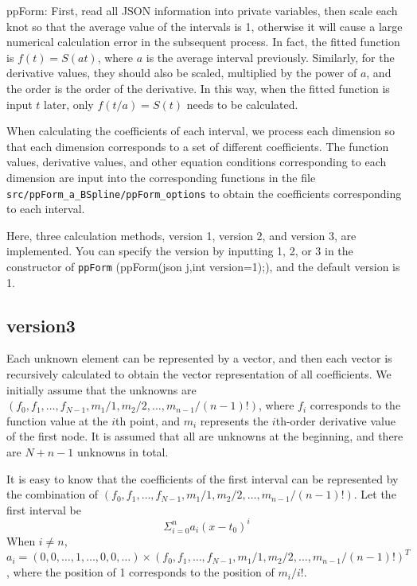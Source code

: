 \documentclass[a4paper]{article}
\begin{document}
ppForm: First, read all JSON information into private variables, then scale each knot so that the average value of the intervals is 1, otherwise it will cause a large numerical calculation error in the subsequent process. In fact, the fitted function is \(f(t) = S(at)\), where \(a\) is the average interval previously. Similarly, for the derivative values, they should also be scaled, multiplied by the power of \(a\), and the order is the order of the derivative. In this way, when the fitted function is input \(t\) later, only \(f(t/a) = S(t)\) needs to be calculated.

When calculating the coefficients of each interval, we process each dimension so that each dimension corresponds to a set of different coefficients. The function values, derivative values, and other equation conditions corresponding to each dimension are input into the corresponding functions in the file \texttt{src/ppForm\_a\_BSpline/ppForm\_options} to obtain the coefficients corresponding to each interval.

Here, three calculation methods, version 1, version 2, and version 3, are implemented. You can specify the version by inputting 1, 2, or 3 in the constructor of \texttt{ppForm} (ppForm(json j,int version=1);), and the default version is 1.

\subsection*{version3}

Each unknown element can be represented by a vector, and then each vector is recursively calculated to obtain the vector representation of all coefficients. We initially assume that the unknowns are \((f_0, f_1, \dots, f_{N-1}, m_1/1, m_2/2, \dots, m_{n-1}/(n-1)!)\), where \(f_i\) corresponds to the function value at the \(i\)th point, and \(m_i\) represents the \(i\)th-order derivative value of the first node. It is assumed that all are unknowns at the beginning, and there are \(N+n-1\) unknowns in total.

It is easy to know that the coefficients of the first interval can be represented by the combination of \((f_0, f_1, \dots, f_{N-1}, m_1/1, m_2/2, \dots, m_{n-1}/(n-1)!)\). Let the first interval be
\[
\Sigma_{i=0}^{n} a_i (x - t_0)^i
\]
When \(i \neq n\), \(a_i = (0, 0, \dots, 1, \dots, 0, 0, \dots) \times (f_0, f_1, \dots, f_{N-1}, m_1/1, m_2/2, \dots, m_{n-1}/(n-1)!)^T\), where the position of 1 corresponds to the position of \(m_i/i!\).
\end{document}
